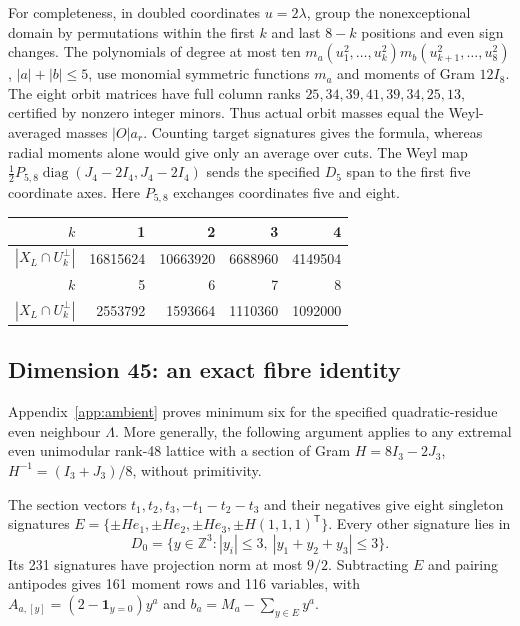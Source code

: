 For completeness, in doubled coordinates $u=2\lambda$, group the
nonexceptional domain by permutations within the first $k$ and last
$8-k$ positions and even sign changes. The polynomials of degree at most ten
$m_a(u_1^2,\ldots,u_k^2)m_b(u_{k+1}^2,\ldots,u_8^2)$,
$|a|+|b|\le5$, use monomial symmetric functions $m_a$ and moments
of Gram $12I_8$. The eight orbit matrices have full column ranks
$25,34,39,41,39,34,25,13$, certified by nonzero integer minors.
Thus actual orbit masses equal the Weyl-averaged masses $|O|a_r$.
Counting target signatures gives the formula, whereas radial moments
alone would give only an average over cuts.
The Weyl map
$\tfrac12P_{5,8}\operatorname{diag}(J_4-2I_4,J_4-2I_4)$
sends the specified $D_5$ span to the first five coordinate axes.
Here $P_{5,8}$ exchanges coordinates five and eight.

\begin{center}
\begin{tabular}{r|rrrr}
$k$&1&2&3&4\\\hline
$|X_L\cap U_k^\perp|$&16815624&10663920&6688960&4149504\\[2pt]
$k$&5&6&7&8\\\hline
$|X_L\cap U_k^\perp|$&2553792&1593664&1110360&1092000
\end{tabular}
\end{center}

\subsection{Dimension 45: an exact fibre identity}
Appendix~\ref{app:ambient} proves minimum six for the specified
quadratic-residue even neighbour $\Lambda$. More generally, the
following argument applies to any extremal even unimodular rank-48
lattice with a section of Gram
$H=8I_3-2J_3$, $H^{-1}=(I_3+J_3)/8$, without primitivity.

The section vectors $t_1,t_2,t_3,-t_1-t_2-t_3$ and their negatives
give eight singleton signatures
$E=\{\pm He_1,\pm He_2,\pm He_3,\pm H(1,1,1)^{\mathsf T}\}$.
Every other signature lies in
\begin{equation}\label{eq:domain45}
D_0=\{y\in\mathbb Z^3:|y_i|\le3,\ |y_1+y_2+y_3|\le3\}.
\end{equation}
Its 231 signatures have projection norm at most $9/2$.
Subtracting $E$ and pairing antipodes gives 161 moment rows and
116 variables, with $A_{a,[y]}=(2-\mathbf1_{y=0})y^a$ and
$b_a=M_a-\sum_{y\in E}y^a$.

